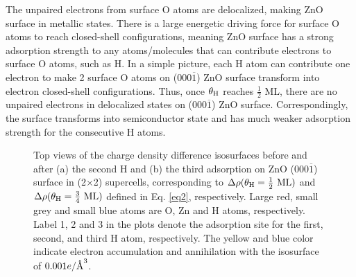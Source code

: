 The unpaired electrons from surface O atoms are delocalized, making ZnO surface in metallic states. There is a large energetic driving force for surface O atoms to reach closed-shell configurations, meaning ZnO surface has a strong adsorption strength to any atoms/molecules that can contribute electrons to surface O atoms, such as H. In a simple picture, each H atom can contribute one electron to make 2 surface O atoms on (000$\overline{1}$) ZnO surface transform into electron closed-shell configurations. Thus, once $\theta_{\textup{H}}$ reaches $\frac{1}{2}$ ML, there are no unpaired electrons in delocalized states on (000$\overline{1}$) ZnO surface. Correspondingly, the surface transforms into semiconductor state and has much weaker adsorption strength for the consecutive H atoms.

\begingroup
\begin{figure}[!ht]
  \centering
  \label{Chap:ZnO_H:fig:chgdiff1}
  \label{Chap:ZnO_H:fig:chgdiff2}
\caption[Top views of the charge density difference isosurfaces before and after H adsorption]{Top views of the charge density difference isosurfaces before and after (a) the second H and (b) the third adsorption on ZnO (000$\overline{1}$) surface in (2$\times$2) supercells, corresponding to $\Delta\rho(\theta_{\textup{H}}= \frac{1}{2} \textup{ ML})$ and $\Delta\rho(\theta_{\textup{H}}= \frac{3}{4} \textup{ ML})$ defined in Eq. \ref{eq2}, respectively. Large red, small grey and small blue atoms are O, Zn and H atoms, respectively. Label 1, 2 and 3 in the plots denote the adsorption site for the first, second, and third H atom, respectively. The yellow and blue color indicate electron accumulation and annihilation with the isosurface of $0.001e/{\textup{\AA}}^3$.}
  \label{fig3}
\end{figure}
\endgroup

